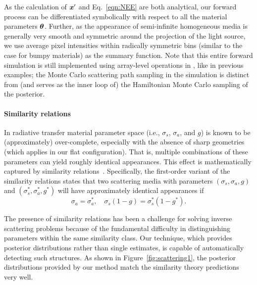
As the calculation of $\bm{x}'$ and Eq.~\eqref{eqn:NEE} are both analytical, our forward process can be differentiated symbolically with respect to all the material parameters $\bm{\theta}$.
Further, as the appearance of semi-infinite homogeneous media is generally very smooth and symmetric around the projection of the light source, we use average pixel intensities within radically symmetric bins (similar to the case for bumpy materials) as the summary function. Note that this entire forward simulation is still implemented using array-level operations in \torch, like in previous examples; the Monte Carlo scattering path sampling in the simulation is distinct from (and serves as the inner loop of) the Hamiltonian Monte Carlo sampling of the posterior.

\paragraph{Similarity relations}
In radiative transfer material parameter space (i.e., $\sigma_s$, $\sigma_a$, and $g$) is known to be (approximately) over-complete, especially with the absence of sharp geometries (which applies in our flat configuration).
That is, multiple combinations of these parameters can yield roughly identical appearances.
This effect is mathematically captured by similarity relations~\cite{Zhao:2014:HSR}.
Specifically, the first-order variant of the similarity relations states that two scattering media with parameters $(\sigma_s, \sigma_a, g)$ and $(\sigma_s^*, \sigma_a^*, g^*)$ will have approximately identical appearances if
%
\begin{equation}
\sigma_a = \sigma_a^*, \quad
\sigma_s (1 - g) = \sigma_s^* (1 - g^*).
\end{equation}

The presence of similarity relations has been a challenge for solving inverse scattering problems because of the fundamental difficulty in distinguishing parameters within the same similarity class.
Our technique, which provides posterior distributions rather than single estimates, is capable of automatically detecting such structures.
As shown in Figure~\ref{fig:scattering1}, the posterior distributions provided by our method match the similarity theory predictions very well.

